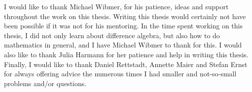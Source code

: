 I would like to thank Michael Wibmer, for his patience, ideas and support throughout the work on this thesis. Writing this thesis would certainly not have been possible if it was not for his mentoring.
In the time spent working on this thesis, I did not only learn about difference algebra, but also how to do mathematics in general, and I have Michael Wibmer to thank for this.
I would also like to thank Julia Harmann for her patience and help in writing this thesis.
Finally, I would like to thank Daniel Rettstadt, Annette Maier and Stefan Ernst for always offering advice the numerous times I had smaller and not-so-small problems and/or questions.
